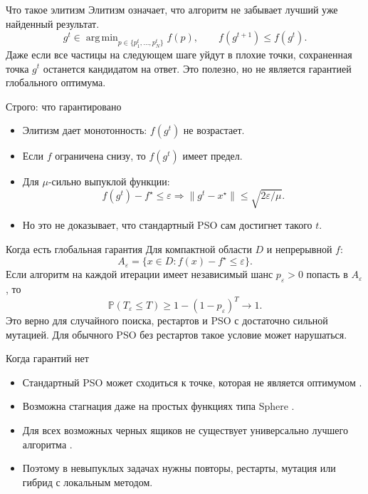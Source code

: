 \documentclass[aspectratio=169,11pt]{beamer}
\DeclareMathOperator*{\argmin}{arg\,min}
\begin{document}
\begin{frame}{Что такое элитизм}
    \large
    Элитизм означает, что алгоритм не забывает лучший уже найденный результат.
    \[
        g^t\in\argmin_{p\in\{p_1^t,\ldots,p_N^t\}} f(p),
        \qquad
        f(g^{t+1})\le f(g^t).
    \]
    \normalsize
    Даже если все частицы на следующем шаге уйдут в плохие точки, сохраненная точка \(g^t\) останется кандидатом на ответ. Это полезно, но не является гарантией глобального оптимума.
\end{frame}

\begin{frame}{Строго: что гарантировано}
    \large
    \begin{itemize}
        \item Элитизм дает монотонность: \(f(g^t)\) не возрастает.
        \item Если \(f\) ограничена снизу, то \(f(g^t)\) имеет предел.
        \item Для \(\mu\)-сильно выпуклой функции:
        \[
            f(g^t)-f^\star\le\varepsilon
            \Rightarrow
            \|g^t-x^\star\|\le\sqrt{2\varepsilon/\mu}.
        \]
        \item Но это не доказывает, что стандартный PSO сам достигнет такого \(t\).
    \end{itemize}
\end{frame}

\begin{frame}{Когда есть глобальная гарантия}
    \large
    Для компактной области \(D\) и непрерывной \(f\):
    \[
        A_\varepsilon=\{x\in D:f(x)-f^\star\le\varepsilon\}.
    \]
    Если алгоритм на каждой итерации имеет независимый шанс
    \(p_\varepsilon>0\) попасть в \(A_\varepsilon\), то
    \[
        \mathbb{P}(T_\varepsilon\le T)\ge 1-(1-p_\varepsilon)^T\to 1.
    \]
    \normalsize
    Это верно для случайного поиска, рестартов и PSO с достаточно сильной мутацией. Для обычного PSO без рестартов такое условие может нарушаться.
\end{frame}

\begin{frame}{Когда гарантий нет}
    \large
    \begin{itemize}
        \item Стандартный PSO может сходиться к точке, которая не является оптимумом \cite{vandenbergh2010convergence}.
        \item Возможна стагнация даже на простых функциях типа Sphere \cite{lehre2011fht,rass2015stagnation}.
        \item Для всех возможных черных ящиков не существует универсально лучшего алгоритма \cite{wolpert1997nofree}.
        \item Поэтому в невыпуклых задачах нужны повторы, рестарты, мутация или гибрид с локальным методом.
    \end{itemize}
\end{frame}
\end{document}
